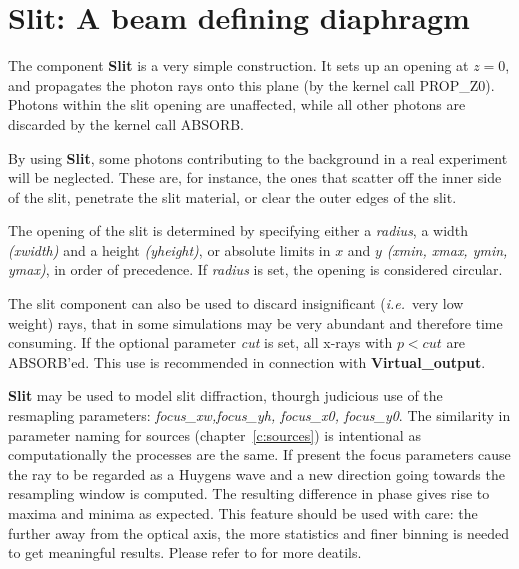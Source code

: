 \section{Slit: A beam defining diaphragm}
\label{s:slit}


The component \textbf{Slit} is a very simple construction.
It sets up an opening at $z=0$, and propagates the photon rays
onto this plane (by the kernel call PROP\_Z0).
Photons within the slit opening are unaffected,
while all other photons are discarded by the kernel call ABSORB.

By using \textbf{Slit}, some photons contributing to the background
in a real experiment will be neglected.
These are, for instance, the ones that scatter off the inner side
of the slit, penetrate the slit material, or clear the outer edges of the slit.

The opening of the slit is determined by specifying either a \textit{radius}, a
width \textit{(xwidth)} and a height \textit{(yheight)}, or absolute limits in $x$
and $y$ \textit{(xmin, xmax, ymin, ymax)}, in order of precedence.
If \textit{radius} is set, the opening is considered circular.

The slit component can also be used to discard insignificant 
({\em i.e.}\ very low weight)
 rays, that in some simulations may be very abundant and therefore
time consuming. If the optional parameter \textit{cut} is set, all
x-rays with $p<\mathit{cut}$ are ABSORB'ed.
This use is recommended in connection with \textbf{Virtual\_output}.

\textbf{Slit} may be used to model slit diffraction, thourgh judicious use of the resmapling
parameters: \textit{focus\_xw,focus\_yh, focus\_x0, focus\_y0}. The similarity in parameter
naming for sources (chapter~\ref{c:sources}) is intentional as computationally the processes are
the same. If present the focus parameters cause the ray to be regarded as a Huygens wave and a new direction
going towards the resampling window is computed. The resulting difference in phase gives rise to maxima and minima as expected.
This feature should be used with care: the further away from the optical
axis, the more statistics and finer binning is needed to get meaningful results. Please refer to \cite{knudsen2013mcxtrace} for more deatils.

